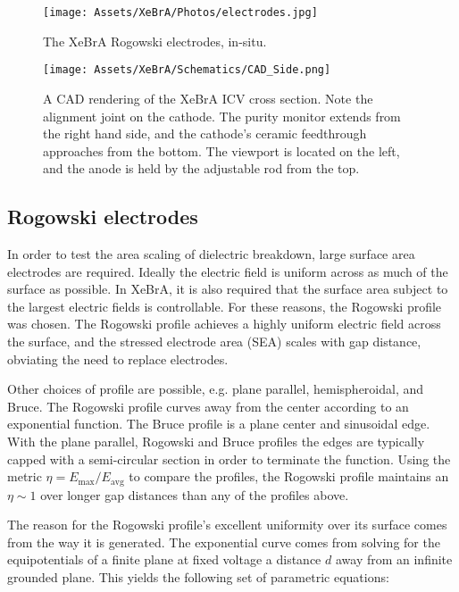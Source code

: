 \begin{figure} 
    \centering
    \texttt{[image: Assets/XeBrA/Photos/electrodes.jpg]}
    \caption{The XeBrA Rogowski electrodes, in-situ.}
    \label{fig:electrodes}
\end{figure}

\begin{figure} 
    \centering
    \texttt{[image: Assets/XeBrA/Schematics/CAD\_Side.png]}
        \caption[A CAD rendering of the XeBrA ICV cross section.]%
        {A CAD rendering of the XeBrA ICV cross section.
    Note the alignment joint on the cathode.
    The purity monitor extends from the right hand side, and the cathode's ceramic feedthrough approaches from the bottom.
    The viewport is located on the left, and the anode is held by the adjustable rod from the top.}
    \label{fig:cad_side}
\end{figure}

\subsection{Rogowski electrodes}
\label{sec:rogowski_intro}
In order to test the area scaling of dielectric breakdown, large surface area electrodes are required.
Ideally the electric field is uniform across as much of the surface as possible.
In XeBrA, it is also required that the surface area subject to the largest electric fields is controllable.
For these reasons, the Rogowski\cite{rogowski_elektrische_1923} profile was chosen.
The Rogowski profile achieves a highly uniform electric field across the surface, and the stressed electrode area (SEA) scales with gap distance, obviating the need to replace electrodes.

Other choices of profile are possible, e.g. plane parallel, hemispheroidal, and Bruce\cite{brodie_studies_1964}.
The Rogowski profile curves away from the center according to an exponential function.
The Bruce profile is a plane center and sinusoidal edge.
With the plane parallel, Rogowski and Bruce profiles the edges are typically capped with a semi-circular section in order to terminate the function.
Using the metric $\eta = E_{\text{max}} / E_{\text{avg}}$ to compare the profiles, the Rogowski profile maintains an $\eta \sim 1$ over longer gap distances than any of the profiles above\cite{gandi_effect_2022}.

The reason for the Rogowski profile's excellent uniformity over its surface comes from the way it is generated.
The exponential curve comes from solving for the equipotentials of a finite plane at fixed voltage a distance $d$ away from an infinite grounded plane.
This yields the following set of parametric equations\cite{trinh_electrode_1980}:

